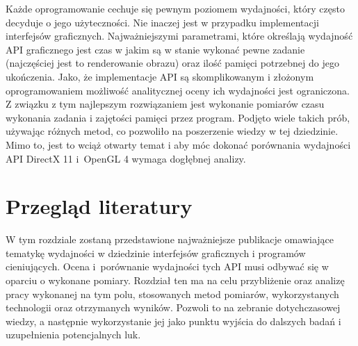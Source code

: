 \documentclass[archive]{mgr}
\begin{document}
Każde oprogramowanie cechuje się pewnym poziomem wydajności, który często decyduje o jego użyteczności. Nie inaczej jest w przypadku implementacji interfejsów graficznych. Najważniejszymi parametrami, które określają wydajność API graficznego jest czas w jakim są w stanie wykonać pewne zadanie (najczęściej jest to renderowanie obrazu) oraz ilość pamięci potrzebnej do jego  ukończenia. Jako, że implementacje API są skomplikowanym i złożonym oprogramowaniem możliwość analitycznej oceny ich wydajności jest ograniczona. Z związku z tym najlepszym rozwiązaniem jest wykonanie pomiarów czasu wykonania zadania i zajętości pamięci przez program. Podjęto wiele takich prób, używając różnych metod, co pozwoliło na poszerzenie wiedzy w tej dziedzinie. Mimo to, jest to wciąż otwarty temat i aby móc dokonać porównania wydajności API DirectX 11 i~OpenGL 4 wymaga dogłębnej analizy.

\chapter{Przegląd literatury}

W tym rozdziale zostaną przedstawione najważniejsze publikacje omawiające tematykę wydajności w dziedzinie interfejsów graficznych i programów cieniujących. Ocena i~porównanie wydajności tych API musi odbywać się w oparciu o wykonane pomiary. Rozdział ten ma na celu przybliżenie oraz analizę pracy wykonanej na tym polu, stosowanych metod pomiarów, wykorzystanych technologii oraz otrzymanych wyników. Pozwoli to na zebranie dotychczasowej wiedzy, a następnie wykorzystanie jej jako punktu wyjścia do dalszych badań i uzupełnienia potencjalnych luk.
\end{document}
